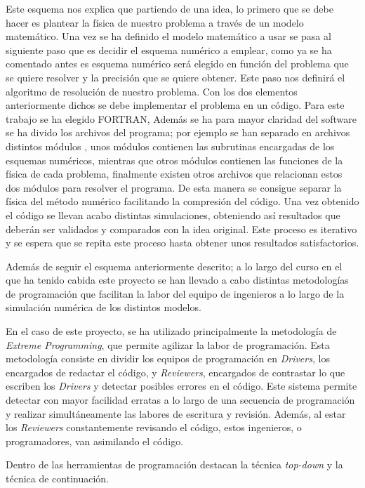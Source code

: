 \documentclass[11pt,singlespacing,liststotoc,headsepline,a4paper]{article}
\begin{document}
Este esquema nos explica que partiendo de una idea, lo primero que se debe hacer es plantear la física de nuestro problema a través de un modelo matemático. Una vez se ha definido el modelo matemático a usar se pasa al siguiente paso que es decidir el esquema numérico a emplear, como ya se ha comentado antes es esquema numérico será elegido en función del problema que se quiere resolver y la precisión que se quiere obtener. Este paso nos definirá el algoritmo de resolución de nuestro problema. Con los dos elementos anteriormente dichos  se debe implementar el problema en un código. Para este trabajo se ha elegido FORTRAN, Además se ha para mayor claridad del software se ha divido los archivos del programa; por ejemplo se han separado en archivos distintos módulos , unos módulos contienen las subrutinas encargadas de los esquemas numéricos, mientras que otros módulos contienen las funciones de la física de cada problema, finalmente existen otros archivos que relacionan estos dos módulos para resolver el programa. De esta manera se consigue separar la física del método numérico facilitando la compresión del código. Una vez obtenido el código se llevan acabo distintas simulaciones, obteniendo así resultados que deberán ser validados y comparados con la idea original. Este proceso es iterativo y se espera que se repita este proceso hasta obtener unos resultados satisfactorios.

Además de seguir el esquema anteriormente descrito; a lo largo del curso en el que ha tenido cabida este proyecto se han llevado a cabo distintas metodologías de programación que facilitan la labor del equipo de ingenieros a lo largo de la simulación numérica de los distintos modelos.

En el caso de este proyecto, se ha utilizado principalmente la metodología de \textit{Extreme Programming}, que permite agilizar la labor de programación. Esta metodología consiste en dividir los equipos de programación en \textit{Drivers}, los encargados de redactar el código, y \textit{Reviewers}, encargados de contrastar lo que escriben los \textit{Drivers} y detectar posibles errores en el código. Este sistema permite detectar con mayor facilidad erratas a lo largo de una secuencia de programación y realizar simultáneamente las labores de escritura y revisión. Además, al estar los \textit{Reviewers} constantemente revisando el código, estos ingenieros, o programadores, van asimilando el código.

Dentro de las herramientas de programación destacan la técnica \textit{top-down} y la técnica de continuación.
\end{document}
